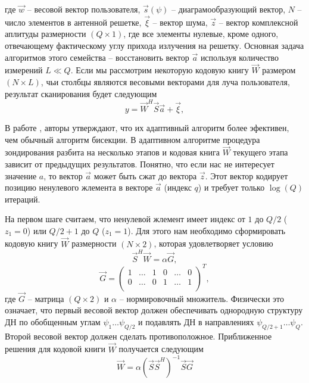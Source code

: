 где $\vec w$ -- весовой вектор пользователя,
$\vec s(\psi)$ -- диаграмообразующий вектор,
$N$ -- число элементов в антенной решетке,
$\vec \xi$ -- вектор шума,
$\vec z$ -- вектор комплексной аплитуды размерности $(Q\times 1)$,
где все элементы нулевые, кроме одного, отвечающему фактическому углу
прихода излучения на решетку.
Основная задача алгоритмов этого семейства -- восстановить вектор $\vec a$
используя количество измерений $L \ll Q$.  Если мы рассмотрим некоторую кодовую
книгу $\vec W$ размером $(N \times L)$, чьи столбцы являются весовыми векторами
для луча пользователя, результат сканирования будет
следующим
\begin{equation}
    \label{eq:4.46}
    y = \vec W^H\vec S \vec a + \vec \xi,
\end{equation}

В работе \cite{Alkhateeb2014}, авторы утверждают, что их адаптивный алгоритм более эфективен,
чем обычный алгоритм бисекции. В адаптивном алгоритме процедура зондирования разбита на несколько этапов
и кодовая книга $\vec W$ текущего этапа зависит от предыдущих результатов. Понятно, что если нас не интересует значение $a$, то
вектор $\vec a$ может быть сжат до вектора $\vec z$. Этот вектор кодирует позицию ненулевого жлемента в векторе $\vec a$ (индекс $q$) и
требует только $\log(Q)$ итераций.

На первом шаге считаем, что ненулевой жлемент имеет индекс от $1$ до $Q/2$ ($z_1=0$) или
$Q/2+1$ до $Q$ ($z_1=1$). Для этого нам необходимо сформировать кодовую книгу $\vec W$ размерности $(N \times 2)$, которая удовлетворяет условию
\begin{equation}
    \label{eq:4.47}
    \vec S^H \vec W = \alpha \vec G,
\end{equation}
\begin{equation}
    \label{eq:4.48}
    \vec G =
    \begin{pmatrix}
        1 & \dots & 1 & 0 & \dots & 0 \\
        0 & \dots & 0 & 1 & \dots & 1 \\
    \end{pmatrix}^T,
\end{equation}
где $\vec G$ -- матрица $(Q \times 2)$ и $\alpha$ -- нормировочный множитель.
Физически это означает, что первый весовой вектор должен обеспечивать однородную структуру ДН по
обобщенным углам $\psi_1 \dots \psi_{Q/2}$ и подавлять ДН в направлениях $\psi_{Q/2 + 1}\dots \psi_Q$. Второй весовой вектор должен сделать противоположное.
Приближенное решения для кодовой книги $\vec W$ получается следующим
\begin{equation}
    \label{eq:4.49}
    \vec W = \alpha (\vec S \vec S^H)^{-1} \vec S \vec G
\end{equation}

